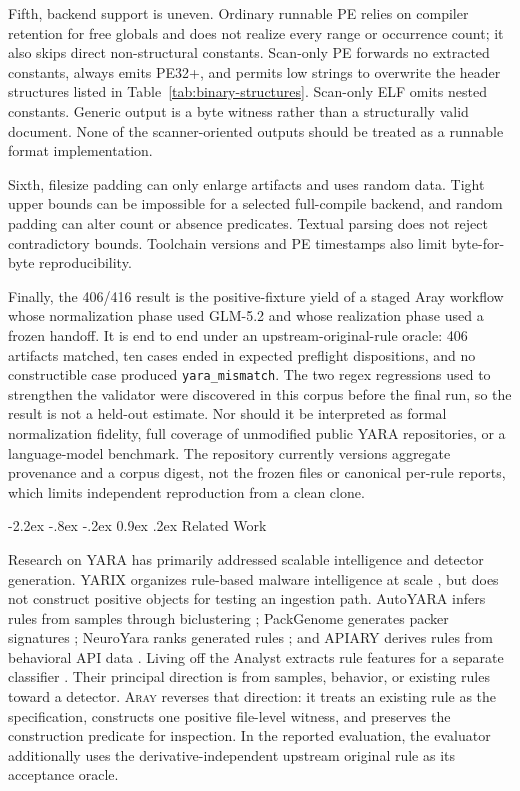 \documentclass[11pt,twocolumn]{article}
\makeatletter
\newcommand{\tool}{\textsc{Aray}\xspace}
\newcommand{\code}[1]{\texttt{#1}}
\renewcommand\section{\@startsection{section}{1}{\z@}%
  {-2.2ex \@plus -.8ex \@minus -.2ex}%
  {0.9ex \@plus .2ex}%
  {\normalfont\large\bfseries}}
\makeatother
\begin{document}
Fifth, backend support is uneven. Ordinary runnable PE relies on compiler
retention for free globals and does not realize every range or occurrence count;
it also skips direct non-structural constants. Scan-only PE forwards no extracted
constants, always emits PE32+, and permits low strings to overwrite the header
structures listed in Table~\ref{tab:binary-structures}. Scan-only ELF omits
nested constants. Generic output is a byte witness rather than a structurally
valid document. None of the scanner-oriented outputs should be treated as a
runnable format implementation.

Sixth, filesize padding can only enlarge artifacts and uses random data. Tight
upper bounds can be impossible for a selected full-compile backend, and random
padding can alter count or absence predicates. Textual parsing does not reject
contradictory bounds. Toolchain versions and PE timestamps also limit
byte-for-byte reproducibility.

Finally, the 406/416 result is the positive-fixture yield of a staged Aray
workflow whose normalization phase used GLM-5.2 and whose realization phase used
a frozen handoff. It is end to end under an upstream-original-rule oracle: 406
artifacts matched, ten cases ended in expected preflight dispositions, and no
constructible case produced \code{yara\_mismatch}. The two regex regressions used
to strengthen the validator were discovered in this corpus before the final run,
so the result is not a held-out estimate. Nor should it be interpreted as formal
normalization fidelity, full coverage of unmodified public YARA repositories, or
a language-model benchmark. The repository currently versions aggregate
provenance and a corpus digest, not the frozen files or canonical per-rule
reports, which limits independent reproduction from a clean clone.

\section{Related Work}

Research on YARA has primarily addressed scalable intelligence and detector
generation. YARIX organizes rule-based malware intelligence at scale
\cite{brengel2021yarix}, but does not construct positive objects for testing an
ingestion path. AutoYARA infers rules from samples through biclustering
\cite{raff2020autoyara}; PackGenome generates packer signatures
\cite{li2023packgenome}; NeuroYara ranks generated rules
\cite{mansour2025neuroyara}; and APIARY derives rules from behavioral API data
\cite{coscia2025apiary}. Living off the Analyst extracts rule features for a
separate classifier \cite{gupta2024living}. Their principal direction is from
samples, behavior, or existing rules toward a detector. \tool reverses that
direction: it treats an existing rule as the specification, constructs one
positive file-level witness, and preserves the construction predicate for
inspection. In the reported evaluation, the evaluator additionally uses the
derivative-independent upstream original rule as its acceptance oracle.
\end{document}
